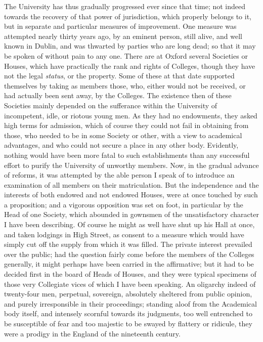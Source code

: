The University has thus
gradually progressed ever since that time; not indeed towards the
recovery of that power of jurisdiction, which properly belongs to it,
but in separate and particular measures of improvement. One measure
was attempted nearly thirty years ago, by an eminent person, still
alive, and well known in Dublin, and was thwarted by parties who are
long dead; so that it may be spoken of without pain to any one. There
are at Oxford several Societies or Houses, which have practically the
rank and rights of Colleges, though they have not the legal \emph{status},
or the property. Some of these at that date supported themselves by
taking as members those, who, either would not be received, or had
actually been sent away, by the Colleges. The existence then of these
Societies mainly depended on the sufferance within the University of
incompetent, idle, or riotous young men. As they had no endowments,
they asked high terms for admission, which of course they could not
fail in obtaining from those, who needed to be in some Society or
other, with a view to academical advantages, and who could not secure
a place in any other body. Evidently, nothing would have been more
fatal to such establishments than any successful effort to purify the
University of unworthy members. Now, in the gradual advance of
reforms, it was attempted by the able person I speak of to introduce
an examination of all members on their matriculation. But the
independence and the interests of both endowed and not endowed
Houses, were at once touched by such a proposition; and a vigorous
opposition was set on foot, in particular by the Head of one Society,
which abounded in gownsmen of the unsatisfactory character I have been
describing. Of course he might as well have shut up his Hall at once,
and taken lodgings in High Street, as consent to a measure which would
have simply cut off the supply from which it was filled. The private
interest prevailed over the public; had the question fairly come
before the members of the Colleges generally, it might perhaps have
been carried in the affirmative; but it had to be decided first in the
board of Heads of Houses, and they were typical specimens of those
very Collegiate vices of which I have been speaking. An oligarchy
indeed of twenty-four men, perpetual, sovereign, absolutely sheltered
from public opinion, and purely irresponsible in their proceedings;
standing aloof from the Academical body itself, and intensely scornful
towards its judgments, too well entrenched to be susceptible of fear
and too majestic to be swayed by flattery or ridicule, they were a
prodigy in the England of the nineteenth century.

